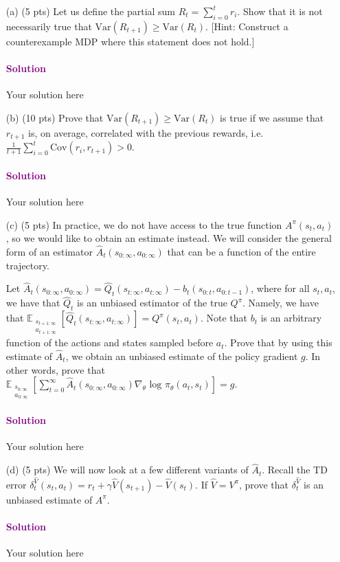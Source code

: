 \documentclass{article}
\newcommand\solution[1]{\paragraph{\textcolor{purple}{Solution}}{\color{purple} #1}}
\begin{document}
\begin{enumerate}

\item[(a) (5 pts)] Let us define the partial sum $R_t = \sum_{i=0}^t r_i$. Show that it is not necessarily true that $\text{Var}(R_{t+1}) \geq \text{Var}(R_{t})$. [Hint: Construct a counterexample MDP where this statement does not hold.]

\solution{
	Your solution here
}

\item[(b) (10 pts)] Prove that $\text{Var}(R_{t+1}) \geq \text{Var}(R_{t})$ is true if we assume that $r_{t+1}$ is, on average, correlated with the previous rewards, i.e. $\frac{1}{t+1} \sum_{i=0}^t \text{Cov}(r_i, r_{t+1}) > 0$. 

\solution{
	Your solution here
}

\item[(c) (5 pts)] In practice, we do not have access to the true function $A^{\pi}(s_t, a_t)$, so we would like to obtain an estimate instead. We will consider the general form of an estimator $\hat{A}_t(s_{0:\infty}, a_{0:\infty})$ that can be a function of the entire trajectory. 

Let $\hat{A}_t(s_{0:\infty}, a_{0:\infty}) = \hat{Q}_t(s_{t:\infty}, a_{t:\infty}) - b_t(s_{0:t}, a_{0:t-1})$, where for all $s_t, a_t$, we have that $\hat{Q}_t$ is an unbiased estimator of the true $Q^{\pi}$. Namely, we have that $\mathbb{E}_{\substack{s_{t+1:\infty}  \\ a_{t+1:\infty}}}[\hat{Q}_t(s_{t:\infty}, a_{t:\infty})] = Q^{\pi}(s_t, a_t)$. Note that $b_t$ is an arbitrary function of the actions and states sampled before $a_t$. Prove that by using this estimate of $\hat{A}_t$, we obtain an unbiased estimate of the policy gradient $g$. In other words, prove that $\mathbb{E}_{\substack{s_{0:\infty}  \\ a_{0:\infty}}}[\sum_{t=0}^{\infty} \hat{A}_t(s_{0:\infty}, a_{0:\infty}) \nabla_{\theta} \text{ log } \pi_{\theta}(a_t, s_t)] = g$. 

\solution{
	Your solution here
}


\item [(d) (5 pts)] We will now look at a few different variants of $\hat{A}_t$. Recall the TD error $\delta_t^{\hat{V}}(s_t, a_t) = r_t + \gamma \hat{V}(s_{t+1}) - \hat{V}(s_t)$. If $\hat{V} = V^{\pi}$, prove that $\delta_t^{\hat{V}}$ is an unbiased estimate of $A^{\pi}$. 

\solution{
	Your solution here
}



\end{enumerate}
\end{document}

